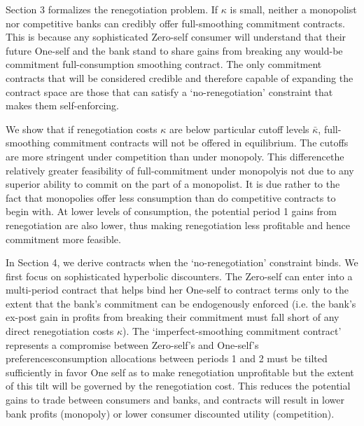 \documentclass[11pt,english]{article}
\theoremstyle{plain}
\theoremstyle{definition}
\begin{document}
Section 3 formalizes the renegotiation problem. If $\kappa$ is small,
neither a monopolist nor competitive banks can credibly offer full-smoothing
commitment contracts. This is because any sophisticated Zero-self
consumer will understand that their future One-self and the bank stand
to share gains from breaking any would-be commitment full-consumption
smoothing contract. The only commitment contracts that will be considered
credible and therefore capable of expanding the contract space are
those that can satisfy a `no-renegotiation' constraint that makes
them self-enforcing. 

We show that if renegotiation costs $\kappa$ are below particular
cutoff levels $\bar{\kappa}$, full-smoothing commitment contracts
will not be offered in equilibrium. The cutoffs are more stringent
under competition than under monopoly. This difference\textendash the
relatively greater feasibility of full-commitment under monopoly\textendash is
not due to any superior ability to commit on the part of a monopolist.
It is due rather to the fact that monopolies offer less consumption
than do competitive contracts to begin with. At lower levels of consumption,
the potential period 1 gains from renegotiation are also lower, thus
making renegotiation less profitable and hence commitment more feasible.

In Section 4, we derive contracts when the `no-renegotiation' constraint
binds. We first focus on sophisticated hyperbolic discounters. The
Zero-self can enter into a multi-period contract that helps bind her
One-self to contract terms only to the extent that the bank's commitment
can be endogenously enforced (i.e. the bank's ex-post gain in profits
from breaking their commitment must fall short of any direct renegotiation
costs $\kappa$). The `imperfect-smoothing commitment contract' represents
a compromise between Zero-self's and One-self's preferences\textendash consumption
allocations between periods 1 and 2 must be tilted sufficiently in
favor One self  as to make renegotiation unprofitable but the extent of this tilt will be governed by the renegotiation cost.
This reduces the potential gains to trade between consumers and banks,
and contracts will result in lower bank profits (monopoly) or lower
consumer discounted utility (competition).
\end{document}

